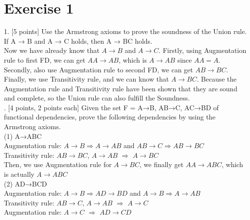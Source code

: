\documentclass[]{article}
\title{}
\author{}
\date{}
\begin{document}
	
	
	
	\section{Exercise 1}
	
	1. [5 points] Use the Armstrong axioms to prove the soundness of the Union rule. If A → B and A → C holds, then A → BC holds. \\
	
	\noindent Now we have already know that $A\rightarrow B$ and $A\rightarrow C$. Firstly, using Augmentation rule to first FD, we can get $AA\rightarrow AB$, which is $A\rightarrow AB$ since $AA = A$. Secondly, also use Augmentation rule to second FD, we can get $AB\rightarrow BC$. Finally, we use Transitivity rule, and we can know that $A\rightarrow BC$. Because the Augmentation rule and Transitivity rule have been shown that they are sound and complete, so the Union rule can also fulfill the Soundness.  \\
	
	. [4 points, 2 points each] Given the set F = {A→B, AB→C, AC→BD} of functional dependencies, prove the following dependencies by using the Armstrong axioms.   \\
	
	(1) A→ABC  \\
	
	Augmentation rule: $A\rightarrow B \Longrightarrow A\rightarrow AB$ and $AB\rightarrow C \Longrightarrow AB\rightarrow BC$  \\
	
	Transitivity rule: $AB\rightarrow BC$, $A\rightarrow AB$ $\Longrightarrow$  $A\rightarrow BC$   \\
	
	Then, we use Augmentation rule for $A\rightarrow BC$, we finally get $AA\rightarrow ABC$, which is actually $A\rightarrow ABC$ \\
	
	(2) AD→BCD  \\
	
	Augmentation rule: $A\rightarrow B \Longrightarrow AD\rightarrow BD$ and $A\rightarrow B \Longrightarrow A\rightarrow AB$  \\
	
	Transitivity rule: $AB\rightarrow C$, $A\rightarrow AB$ $\Longrightarrow$  $A\rightarrow C$   \\
	
	Augmentation rule: $A\rightarrow C$ $\Longrightarrow$  $AD\rightarrow CD$   \\
	
\end{document}
